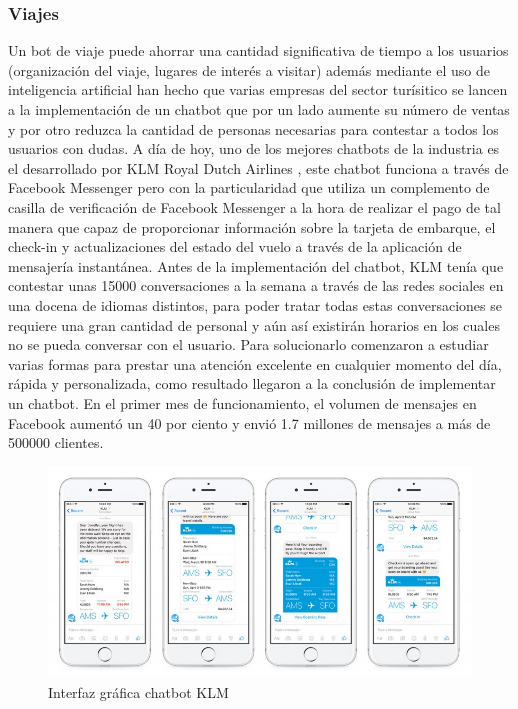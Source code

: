 \subsubsection{Viajes}
Un bot de viaje puede ahorrar una cantidad significativa de tiempo a los usuarios (organización del viaje, lugares de interés a visitar) además mediante el uso de inteligencia artificial han hecho que varias empresas del sector turísitico se lancen a la implementación de un chatbot que por un lado aumente su número de ventas y por otro reduzca la cantidad de personas necesarias para contestar a todos los usuarios con dudas.
A día de hoy, uno de los mejores chatbots de la industria es el desarrollado por KLM Royal Dutch Airlines \cite{klm}, este chatbot funciona a través de Facebook Messenger pero con la particularidad que utiliza un complemento de casilla de verificación de Facebook Messenger a la hora de realizar el pago de tal manera que capaz de proporcionar información sobre la tarjeta de embarque, el check-in y actualizaciones del estado del vuelo a través de la aplicación de mensajería instantánea.
Antes de la implementación del chatbot, KLM tenía que contestar unas 15000 conversaciones a la semana a través de las redes sociales en una docena de idiomas distintos, para poder tratar todas estas conversaciones se requiere una gran cantidad de personal y aún así existirán horarios en los cuales no se pueda conversar con el usuario. Para solucionarlo comenzaron a estudiar varias formas para prestar una atención excelente en cualquier momento del día, rápida y personalizada, como resultado llegaron a la conclusión de implementar un chatbot. 
En el primer mes de funcionamiento, el volumen de mensajes en Facebook aumentó un 40 por ciento y envió 1.7 millones de mensajes a más de 500000 clientes.

\begin{figure}[h]
    \centering
    \includegraphics[width=\textwidth]{include/figuras/klm-chatbot.jpg}
    \caption{Interfaz gráfica chatbot KLM}
    \label{fig:klm}
\end{figure}


